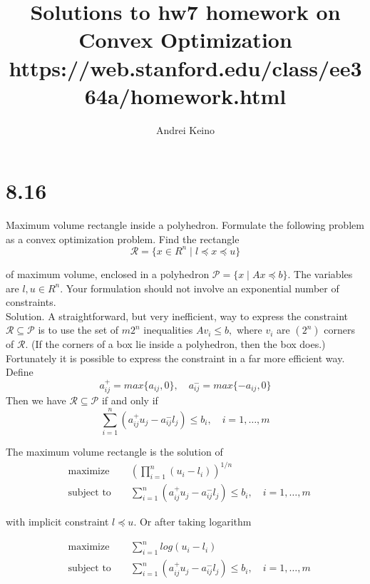 \documentclass{article}
\begin{document}
\title{Solutions to hw7 homework on Convex Optimization https://web.stanford.edu/class/ee364a/homework.html}
\author{Andrei Keino}
\maketitle


\section*{8.16}

Maximum volume rectangle inside a polyhedron. Formulate the following problem as a
convex optimization problem. Find the rectangle 
$$
\mathcal{R} = \{x \in R^n \; | \; l \preceq x \preceq u \}
$$

of maximum volume, enclosed in a polyhedron 
$\mathcal{P} = \{x \; | \; Ax \preceq b\}.$ The variables 
are $l, u \in R^n.$ Your formulation should not involve an exponential number of constraints. \\

Solution. A straightforward, but very inefficient, way to express the constraint $\mathcal{R} \subseteq \mathcal{P}$
is to use the set of $m 2^n$ inequalities $A v_i \leq b,$ where $v_i$ are $(2^n)$ corners of $\mathcal{R}.$ (If the
corners of a box lie inside a polyhedron, then the box does.) Fortunately it is possible
to express the constraint in a far more efficient way. Define 
$$
a_{ij}^+ = max\{a_{ij}, 0\}, \quad 
a_{ij}^- = max\{-a_{ij}, 0\}
$$
Then we have $\mathcal{R} \subseteq \mathcal{P}$ if and 
only if 
$$
\sum_{i = 1}^n (a_{ij}^+ u_j - a_{ij}^- l_j) \leq b_i, \quad i = 1, \dots, m 
$$

The maximum volume rectangle is the solution of
\begin{align*}
	&\text{maximize } && 
	(\prod_{i = 1}^n (u_i - l_i))^{1/n}
	\\
	&\text{subject to } 
	&& \sum_{i = 1}^n (a_{ij}^+ u_j - a_{ij}^- l_j) \leq b_i, \quad i = 1, \dots, m
\end{align*}

with implicit constraint $l \preceq u.$ 
Or after taking logarithm

\begin{align*}
	&\text{maximize } && 
	\sum_{i = 1}^n log(u_i - l_i)
	\\
	&\text{subject to } 
	&& \sum_{i = 1}^n (a_{ij}^+ u_j - a_{ij}^- l_j) \leq b_i, \quad i = 1, \dots, m
\end{align*}
\end{document}
